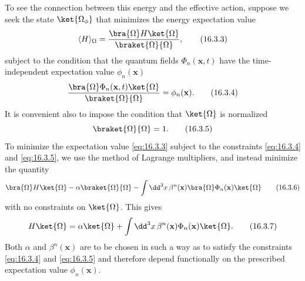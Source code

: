 To see the connection between this energy and the effective action, suppose we seek the state $\ket{\Omega_\phi}$ that minimizes the energy expectation value
\begin{equation}
\langle H\rangle_\Omega
=\frac{\bra{\Omega}H\ket{\Omega}}{\braket{\Omega}{\Omega}},
\tag{16.3.3}\label{eq:16.3.3}
\end{equation}
subject to the condition that the quantum fields $\Phi_n(\mathbf{x},t)$ have the time-independent expectation value $\phi_n(\mathbf{x})$
\begin{equation}
\frac{\bra{\Omega}\Phi_n(\mathbf{x},t)\ket{\Omega}}
{\braket{\Omega}{\Omega}}
=\phi_n(\mathbf{x}).
\tag{16.3.4}\label{eq:16.3.4}
\end{equation}
It is convenient also to impose the condition that $\ket{\Omega}$ is normalized
\begin{equation}
\braket{\Omega}{\Omega}=1.
\tag{16.3.5}\label{eq:16.3.5}
\end{equation}
To minimize the expectation value \eqref{eq:16.3.3} subject to the constraints \eqref{eq:16.3.4} and \eqref{eq:16.3.5}, we use the method of Lagrange multipliers, and instead minimize the quantity
\begin{equation}
\bra{\Omega}H\ket{\Omega}
-\alpha\braket{\Omega}{\Omega}
-\int \dd^3x\,\beta^n(\mathbf{x})
 \bra{\Omega}\Phi_n(\mathbf{x})\ket{\Omega}
\tag{16.3.6}\label{eq:16.3.6}
\end{equation}
with no constraints on $\ket{\Omega}$. This gives
\begin{equation}
H\ket{\Omega}=\alpha\ket{\Omega}
+\int \dd^3x\,\beta^n(\mathbf{x})\Phi_n(\mathbf{x})\ket{\Omega}.
\tag{16.3.7}\label{eq:16.3.7}
\end{equation}
Both $\alpha$ and $\beta^n(\mathbf{x})$ are to be chosen in such a way as to satisfy the constraints \eqref{eq:16.3.4} and \eqref{eq:16.3.5} and therefore depend functionally on the prescribed expectation value $\phi_n(\mathbf{x})$.

